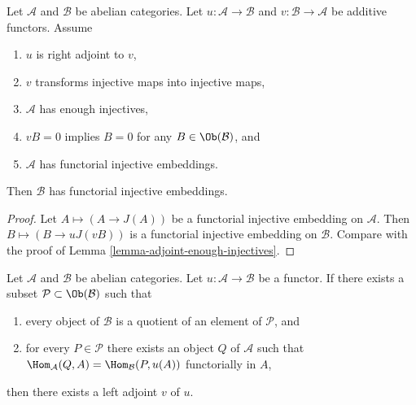 \begin{lemma}
\label{lemma-adjoint-functorial-injectives}
Let $\mathcal{A}$ and $\mathcal{B}$ be abelian categories.
Let $u : \mathcal{A} \to \mathcal{B}$ and
$v : \mathcal{B} \to \mathcal{A}$ be additive functors.
Assume
\begin{enumerate}
\item $u$ is right adjoint to $v$,
\item $v$ transforms injective maps into injective maps,
\item $\mathcal{A}$ has enough injectives,
\item $vB = 0$ implies $B = 0$ for any $B \in \Ob(\mathcal{B})$, and
\item $\mathcal{A}$ has functorial injective embeddings.
\end{enumerate}
Then $\mathcal{B}$ has functorial injective embeddings.
\end{lemma}

\begin{proof}
Let $A \mapsto (A \to J(A))$ be a functorial
injective embedding on $\mathcal{A}$. Then
$B \mapsto (B \to uJ(vB))$ is a functorial
injective embedding on $\mathcal{B}$. Compare with the
proof of Lemma \ref{lemma-adjoint-enough-injectives}.
\end{proof}

\begin{lemma}
\label{lemma-partially-defined-adjoint}
Let $\mathcal{A}$ and $\mathcal{B}$ be abelian categories.
Let $u : \mathcal{A} \to \mathcal{B}$ be a functor.
If there exists a subset $\mathcal{P} \subset \Ob(\mathcal{B})$
such that
\begin{enumerate}
\item every object of $\mathcal{B}$ is a quotient of an element
of $\mathcal{P}$, and
\item for every $P \in \mathcal{P}$ there exists an object
$Q$ of $\mathcal{A}$ such that
$\Hom_\mathcal{A}(Q, A) = \Hom_\mathcal{B}(P, u(A))$ functorially
in $A$,
\end{enumerate}
then there exists a left adjoint $v$ of $u$.
\end{lemma}

